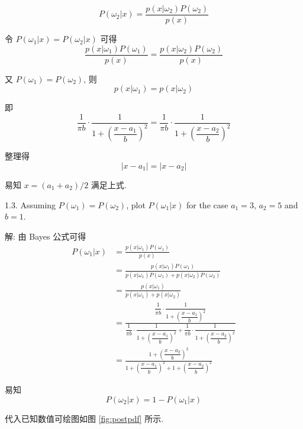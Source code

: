 \documentclass{article}
\begin{document}
\begin{equation}
  P(\omega_2|x)=\frac{p(x|\omega_2)P(\omega_2)}{p(x)}
\end{equation}

令 $P(\omega_1|x)=P(\omega_2|x)$ 可得
\begin{equation}
  \frac{p(x|\omega_1)P(\omega_1)}{p(x)}=\frac{p(x|\omega_2)P(\omega_2)}{p(x)}
\end{equation}

又 $P(\omega_1) = P(\omega_2)$, 则
\begin{equation}
  p(x|\omega_1)=p(x|\omega_2)
\end{equation}

即
\begin{equation}
  \frac{1}{\pi b} \cdot \frac{1}{1+\left(\dfrac{x-a_1}{b}\right)^2}=\frac{1}{\pi b} \cdot \frac{1}{1+\left(\dfrac{x-a_2}{b}\right)^2}
\end{equation}

整理得
\begin{equation}
  |x-a_1|=|x-a_2|
\end{equation}

易知 $x=(a_1+a_2)/2$ 满足上式.

1.3. Assuming $P(\omega_1) = P(\omega_2)$, plot $P(\omega_1|x)$ for the case $a_1=3$, $a_2=5$ and $b=1$.

解: 由 Bayes 公式可得
\begin{equation}
  \begin{aligned}
    P(\omega_1|x)
    &=\frac{p(x|\omega_1)P(\omega_1)}{p(x)}\\
    &=\frac{p(x|\omega_1)P(\omega_1)}{p(x|\omega_1)P(\omega_1)+p(x|\omega_2)P(\omega_2)}\\
    &=\frac{p(x|\omega_1)}{p(x|\omega_1)+p(x|\omega_2)}\\
    &=\frac{\dfrac{1}{\pi b} \cdot \dfrac{1}{1+\left(\dfrac{x-a_1}{b}\right)^2}}{\dfrac{1}{\pi b} \cdot \dfrac{1}{1+\left(\dfrac{x-a_1}{b}\right)^2}+\dfrac{1}{\pi b} \cdot \dfrac{1}{1+\left(\dfrac{x-a_2}{b}\right)^2}}\\
    &=\frac{1+\left(\dfrac{x-a_2}{b}\right)^2}{1+\left(\dfrac{x-a_1}{b}\right)^2+1+\left(\dfrac{x-a_2}{b}\right)^2}
  \end{aligned}
  \label{eq:postpdf}
\end{equation}

易知
\begin{equation}
  P(\omega_2|x)=1-P(\omega_1|x)
\end{equation}

代入已知数值可绘图如图 \ref{fig:postpdf} 所示.
\end{document}
